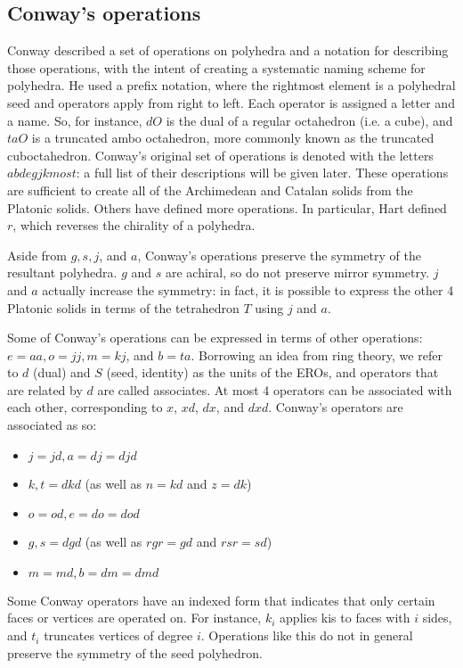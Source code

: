 \documentclass{amsart}[12pt]
\begin{document}
\subsection{Conway's operations}
Conway described a set of operations on polyhedra and a notation for describing
those operations, with the intent of creating a systematic naming scheme for
polyhedra. He used a prefix notation, where the rightmost element is a
polyhedral seed and operators apply from right to left. Each operator is
assigned a letter and a name. So, for instance, $dO$ is the dual of a regular
octahedron (i.e. a cube), and $taO$ is a truncated ambo octahedron, more
commonly known as the truncated cuboctahedron. Conway's original set of
operations is denoted with the letters $abdegjkmost$: a full list of their
descriptions will be given later. These operations are sufficient to create all
of the Archimedean and Catalan solids from the Platonic solids. Others have
defined more operations. \cite{HartConway}\cite{HartPropeller}\cite{antiprism}
In particular, Hart \cite{HartConway} defined $r$,
which reverses the chirality of a polyhedra.

Aside from $g, s, j$, and $a$, Conway's operations preserve the
symmetry of the resultant polyhedra. $g$ and $s$ are achiral, so
do not preserve mirror symmetry. $j$ and $a$ actually increase
the symmetry: in fact, it is possible to express the other 4 Platonic solids
in terms of the tetrahedron $T$ using $j$ and $a$.

Some of Conway's operations can be expressed in terms of other operations:
$e=aa, o=jj, m=kj$, and $b=ta$. Borrowing an idea from ring
theory, we refer to $d$ (dual) and $S$ (seed, identity) as the
units of the EROs, and operators that are related by $d$ are called
associates. At most 4 operators can be associated with each other, corresponding
to $x$, $xd$, $dx$, and $dxd$.
Conway's operators are associated as so:

\begin{itemize}
  \item $j=jd, a=dj=djd$
  \item $k, t=dkd$ (as well as $n=kd$ and $z=dk$)
  \item $o=od, e=do=dod$
  \item $g, s=dgd$ (as well as $rgr=gd$ and $rsr=sd$)
  \item $m=md, b=dm=dmd$
\end{itemize}

Some Conway operators have an indexed form that indicates that only certain faces or
vertices are operated on. For instance, $k_i$ applies kis to faces with
$i$ sides, and $t_i$ truncates vertices of degree $i$.
Operations like this do not in general preserve the symmetry of the seed
polyhedron.
\end{document}
